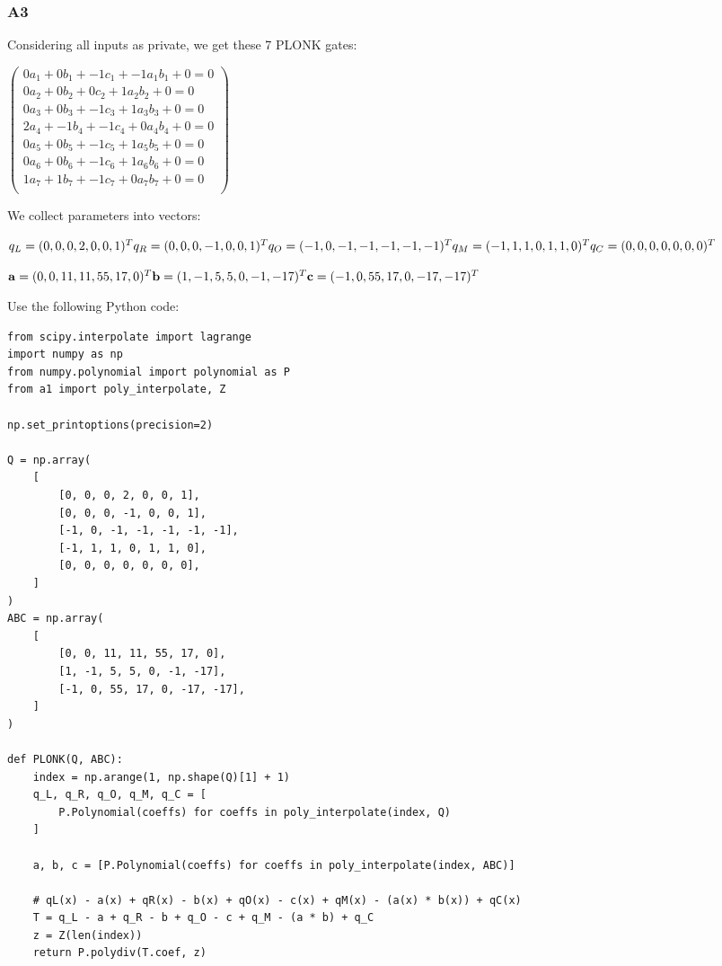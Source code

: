 \documentclass[11pt]{article}
\begin{document}
\subsubsection{A3}
\label{a3}
Considering all inputs as private, we get these 7 PLONK gates:

\(\begin{pmatrix} 0 a_1 + 0 b_1 + -1 c_1 + -1 a_1 b_1 + 0 = 0 \\ 0 a_2 + 0 b_2 + 0 c_2 + 1 a_2 b_2 + 0 = 0 \\ 0 a_3 + 0 b_3 + -1 c_3 + 1 a_3 b_3 + 0 = 0 \\ 2 a_4 + -1 b_4 + -1 c_4 + 0 a_4 b_4 + 0 = 0 \\ 0 a_5 + 0 b_5 + -1 c_5 + 1 a_5 b_5 + 0 = 0 \\ 0 a_6 + 0 b_6 + -1 c_6 + 1 a_6 b_6 + 0 = 0 \\ 1 a_7 + 1 b_7 + -1 c_7 + 0 a_7 b_7 + 0 = 0 \\ \end{pmatrix}\)

We collect parameters into vectors:

\(q_L = (0,0,0,2,0,0,1)^T \\ q_R = (0,0,0,-1,0,0,1)^T \\ q_O = (-1,0,-1,-1,-1,-1,-1)^T \\ q_M = (-1,1,1,0,1,1,0)^T \\ q_C = (0,0,0,0,0,0,0)^T\)

\(\mathbf{a} = (0, 0, 11, 11, 55, 17, 0)^T \\ \mathbf{b} = (1, -1, 5, 5, 0, -1, -17)^T \\ \mathbf{c} = (-1, 0, 55, 17, 0, -17, -17)^T\)

Use the following Python code:

\begin{verbatim}
from scipy.interpolate import lagrange
import numpy as np
from numpy.polynomial import polynomial as P
from a1 import poly_interpolate, Z

np.set_printoptions(precision=2)

Q = np.array(
    [
        [0, 0, 0, 2, 0, 0, 1],
        [0, 0, 0, -1, 0, 0, 1],
        [-1, 0, -1, -1, -1, -1, -1],
        [-1, 1, 1, 0, 1, 1, 0],
        [0, 0, 0, 0, 0, 0, 0],
    ]
)
ABC = np.array(
    [
        [0, 0, 11, 11, 55, 17, 0],
        [1, -1, 5, 5, 0, -1, -17],
        [-1, 0, 55, 17, 0, -17, -17],
    ]
)

def PLONK(Q, ABC):
    index = np.arange(1, np.shape(Q)[1] + 1)
    q_L, q_R, q_O, q_M, q_C = [
        P.Polynomial(coeffs) for coeffs in poly_interpolate(index, Q)
    ]

    a, b, c = [P.Polynomial(coeffs) for coeffs in poly_interpolate(index, ABC)]

    # qL(x) - a(x) + qR(x) - b(x) + qO(x) - c(x) + qM(x) - (a(x) * b(x)) + qC(x)
    T = q_L - a + q_R - b + q_O - c + q_M - (a * b) + q_C
    z = Z(len(index))
    return P.polydiv(T.coef, z)
\end{verbatim}
\end{document}
